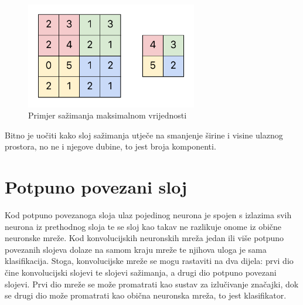 \begin{figure}[htb]
    \centering
    \includegraphics[width=7.5cm]{images/pool_example.pdf}
    \caption{Primjer sažimanja maksimalnom vrijednosti}
    \label{fig:pool_example}
\end{figure}

Bitno je uočiti kako sloj sažimanja utječe na smanjenje širine i visine ulaznog prostora, no ne i njegove dubine, to jest broja komponenti.

\section{Potpuno povezani sloj}

Kod potpuno povezanoga sloja ulaz pojedinog neurona je spojen s izlazima svih neurona iz prethodnog sloja te se sloj kao takav ne razlikuje onome iz obične neuronske mreže. Kod konvolucijskih neuronskih mreža jedan ili više potpuno povezanih slojeva dolaze na samom kraju mreže te njihova uloga je sama klasifikacija. Stoga, konvolucijske mreže se mogu rastaviti na dva dijela: prvi dio čine konvolucijski slojevi te slojevi sažimanja, a drugi dio potpuno povezani slojevi. Prvi dio mreže se može promatrati kao sustav za izlučivanje značajki, dok se drugi dio može promatrati kao obična neuronska mreža, to jest klasifikator.